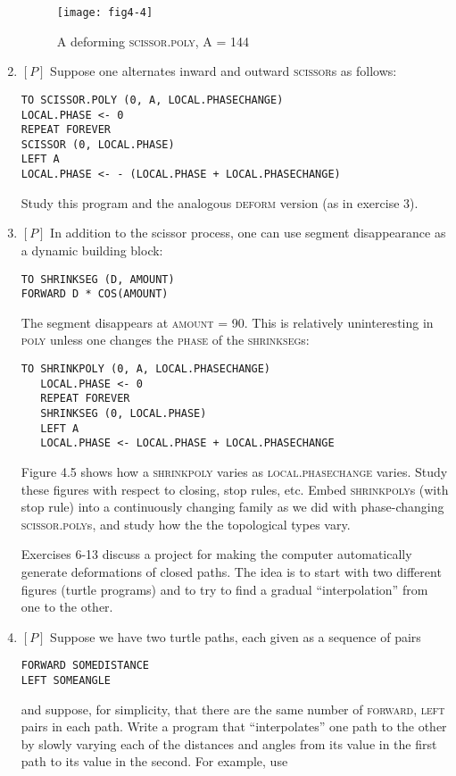 \documentclass{book}
\begin{document}
\begin{enumerate}
\begin{figure}
\begin{center}
\texttt{[image: fig4-4]}
\caption{A deforming \textsc{scissor}\textsc{.poly}, A = 144}
\end{center}
\end{figure}

\item $[P]$ Suppose one alternates inward and outward \textsc{scissor}s as follows:

\begin{verbatim}
TO SCISSOR.POLY (0, A, LOCAL.PHASECHANGE)
LOCAL.PHASE <- 0
REPEAT FOREVER
SCISSOR (0, LOCAL.PHASE)
LEFT A
LOCAL.PHASE <- - (LOCAL.PHASE + LOCAL.PHASECHANGE)
\end{verbatim}
Study this program and the analogous \textsc{deform} version (as in exercise 3).

\item $[P]$ In addition to the scissor process, one can use segment disappearance as a dynamic building block:

\begin{verbatim}
TO SHRINKSEG (D, AMOUNT)
FORWARD D * COS(AMOUNT)
\end{verbatim}
The segment disappears at \textsc{amount} = 90. This is relatively uninteresting
in \textsc{poly} unless one changes the \textsc{phase} of the \textsc{shrinkseg}s:

\begin{verbatim}
TO SHRINKPOLY (0, A, LOCAL.PHASECHANGE)
   LOCAL.PHASE <- 0
   REPEAT FOREVER
   SHRINKSEG (0, LOCAL.PHASE)
   LEFT A
   LOCAL.PHASE <- LOCAL.PHASE + LOCAL.PHASECHANGE
\end{verbatim}
Figure 4.5 shows how a \textsc{shrinkpoly} varies as \textsc{local}\textsc{.phasechange}
varies. Study these figures with respect to closing, stop rules, etc. Embed
\textsc{shrinkpoly}s (with stop rule) into a continuously changing family as
we did with phase-changing \textsc{scissor}\textsc{.poly}s, and study how the the
topological types vary.

Exercises 6-13 discuss a project for making the computer automatically generate deformations of closed paths. The idea is to start with
two different figures (turtle programs) and to try to find a gradual
``interpolation'' from one to the other.

\item $[P]$ Suppose we have two turtle paths, each given as a sequence of
pairs

\begin{verbatim}
FORWARD SOMEDISTANCE
LEFT SOMEANGLE
\end{verbatim}
and suppose, for simplicity, that there are the same number of \textsc{forward},
\textsc{left} pairs in each path. Write a program that ``interpolates'' one path
to the other by slowly varying each of the distances and angles from its
value in the first path to its value in the second. For example, use


\end{enumerate}
\end{document}
